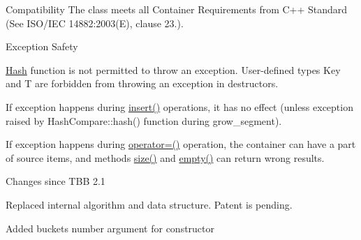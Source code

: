 \begin{DoxyParagraph}{Compatibility}
The class meets all Container Requirements from C++ Standard (See I\+S\+O/\+I\+E\+C 14882\+:2003(E), clause 23.).
\end{DoxyParagraph}
\begin{DoxyParagraph}{Exception Safety}

\begin{DoxyItemize}
\item \hyperlink{structHash}{Hash} function is not permitted to throw an exception. User-\/defined types Key and T are forbidden from throwing an exception in destructors.
\item If exception happens during \hyperlink{classtbb_1_1interface5_1_1concurrent__hash__map_ae20cd9cdb08def2bcb2fd86c8276f52b}{insert()} operations, it has no effect (unless exception raised by Hash\+Compare\+::hash() function during grow\+\_\+segment).
\item If exception happens during \hyperlink{classtbb_1_1interface5_1_1concurrent__hash__map_ad0f01ce516b8d3ab574954843622c7cd}{operator=()} operation, the container can have a part of source items, and methods \hyperlink{classtbb_1_1interface5_1_1concurrent__hash__map_a252731d8fa53963cc28fbc0e2172c4d0}{size()} and \hyperlink{classtbb_1_1interface5_1_1concurrent__hash__map_aa6bb663b0b7d69c4c80057849ef11ab7}{empty()} can return wrong results.
\end{DoxyItemize}
\end{DoxyParagraph}
\begin{DoxyParagraph}{Changes since T\+B\+B 2.1}

\begin{DoxyItemize}
\item Replaced internal algorithm and data structure. Patent is pending.
\item Added buckets number argument for constructor
\end{DoxyItemize}
\end{DoxyParagraph}
